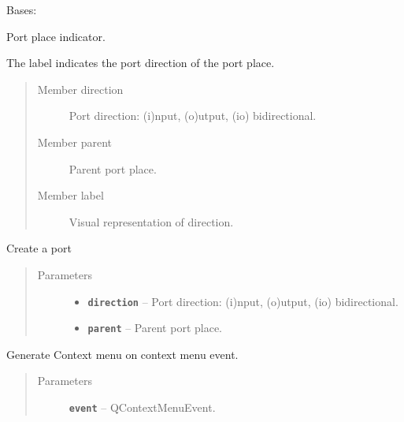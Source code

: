 \documentclass[a4paper,10pt,english]{sphinxmanual}
\begin{document}
\begin{fulllineitems}
\label{model_link:model.PortItem.PortItem}
Bases: 

Port place indicator.

The label indicates the port direction of the port place.
\begin{quote}\begin{description}
\item[{Member direction}] \leavevmode
Port direction: (i)nput, (o)utput, (io) bidirectional.

\item[{Member parent}] \leavevmode
Parent port place.

\item[{Member label}] \leavevmode
Visual representation of direction.

\end{description}\end{quote}

\begin{fulllineitems}
\label{model_link:model.PortItem.PortItem.__init__}
Create a port
\begin{quote}\begin{description}
\item[{Parameters}] \leavevmode\begin{itemize}
\item {} 
\textbf{\texttt{direction}} -- Port direction: (i)nput, (o)utput, (io) bidirectional.

\item {} 
\textbf{\texttt{parent}} -- Parent port place.

\end{itemize}

\end{description}\end{quote}

\end{fulllineitems}


\begin{fulllineitems}
\label{model_link:model.PortItem.PortItem.contextMenuEvent}
Generate Context menu on context menu event.
\begin{quote}\begin{description}
\item[{Parameters}] \leavevmode
\textbf{\texttt{event}} -- QContextMenuEvent.


\end{description}
\end{quote}
\end{fulllineitems}
\end{fulllineitems}
\end{document}

